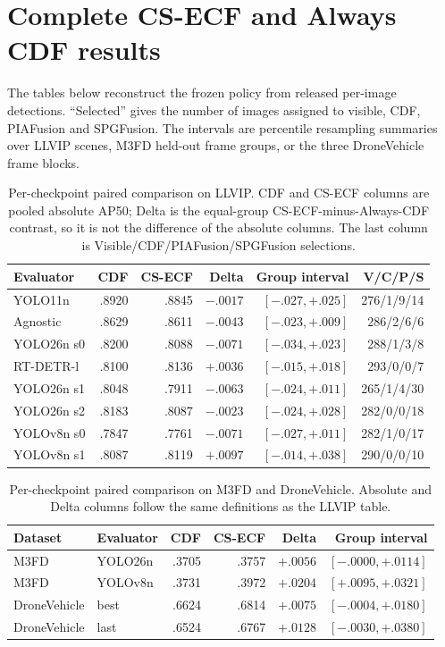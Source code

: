 \documentclass[11pt]{article}
\begin{document}
\section{Complete CS-ECF and Always CDF results}

The tables below reconstruct the frozen policy from released per-image
detections. ``Selected'' gives the number of images assigned to visible, CDF,
PIAFusion and SPGFusion. The intervals are percentile resampling summaries over
LLVIP scenes, M3FD held-out frame groups, or the three DroneVehicle frame
blocks.

\begin{table}[ht]
\centering
\small
\caption{Per-checkpoint paired comparison on LLVIP. CDF and CS-ECF columns are
pooled absolute AP50; Delta is the equal-group CS-ECF-minus-Always-CDF
contrast, so it is not the difference of the absolute columns. The last column
is Visible/CDF/PIAFusion/SPGFusion selections.}
\label{tab:llvip-cdf}
\begin{tabular}{@{}lrrrrr@{}}
\toprule
Evaluator & CDF & CS-ECF & Delta & Group interval & V/C/P/S \\
\midrule
YOLO11n & .8920 & .8845 & \(-.0017\) & \([-.027,+.025]\) & 276/1/9/14 \\
Agnostic & .8629 & .8611 & \(-.0043\) & \([-.023,+.009]\) & 286/2/6/6 \\
YOLO26n s0 & .8200 & .8088 & \(-.0071\) & \([-.034,+.023]\) & 288/1/3/8 \\
RT-DETR-l & .8100 & .8136 & \(+.0036\) & \([-.015,+.018]\) & 293/0/0/7 \\
YOLO26n s1 & .8048 & .7911 & \(-.0063\) & \([-.024,+.011]\) & 265/1/4/30 \\
YOLO26n s2 & .8183 & .8087 & \(-.0023\) & \([-.024,+.028]\) & 282/0/0/18 \\
YOLOv8n s0 & .7847 & .7761 & \(-.0071\) & \([-.027,+.011]\) & 282/1/0/17 \\
YOLOv8n s1 & .8087 & .8119 & \(+.0097\) & \([-.014,+.038]\) & 290/0/0/10 \\
\bottomrule
\end{tabular}
\end{table}

\begin{table}[ht]
\centering
\small
\caption{Per-checkpoint paired comparison on M3FD and DroneVehicle. Absolute
and Delta columns follow the same definitions as the LLVIP table.}
\label{tab:external-cdf}
\begin{tabular}{@{}llrrrr@{}}
\toprule
Dataset & Evaluator & CDF & CS-ECF & Delta & Group interval \\
\midrule
M3FD & YOLO26n & .3705 & .3757 & \(+.0056\) & \([-.0000,+.0114]\) \\
M3FD & YOLOv8n & .3731 & .3972 & \(+.0204\) & \([+.0095,+.0321]\) \\
DroneVehicle & best & .6624 & .6814 & \(+.0075\) & \([-.0004,+.0180]\) \\
DroneVehicle & last & .6524 & .6767 & \(+.0128\) & \([-.0030,+.0380]\) \\
\bottomrule
\end{tabular}
\end{table}
\end{document}
